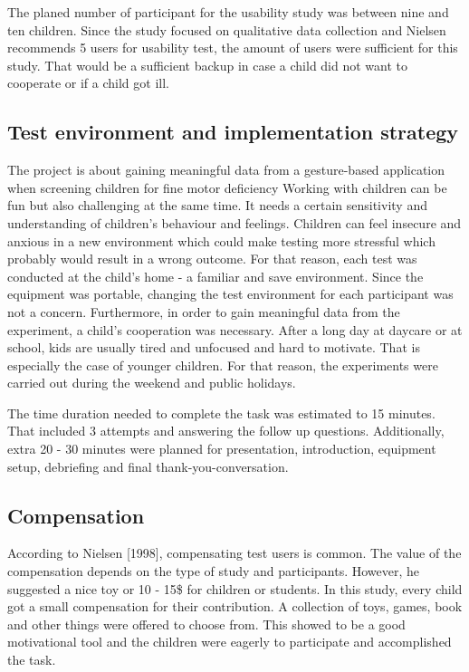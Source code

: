 The planed number of participant for the usability study was between nine and ten children. Since the study focused on qualitative data collection and Nielsen recommends 5 users for usability test, the amount of users were sufficient for this study. That would be a sufficient backup in case a child did not want to cooperate or if a child got ill. 


\subsection{Test environment and implementation strategy}
\label{sec:environmnent}

The project is about gaining meaningful data from a gesture-based application when screening children for fine motor deficiency
Working with children can be fun but also challenging at the same time. It needs a certain sensitivity and understanding of children's behaviour and feelings. Children can feel insecure  and anxious in a new environment which could make testing more stressful which probably would result in a wrong outcome. For that reason, each test was conducted at the child's home - a familiar and save environment. Since the equipment was portable, changing the test environment for each participant was not a concern.
Furthermore, in order to gain meaningful data from the experiment, a child's cooperation was necessary.  After a long day at daycare or at school, kids are usually tired and unfocused and hard to motivate. That is especially the case of younger children. For that reason, the experiments were carried out during the weekend and public holidays.  

The time duration needed to complete the task was estimated to 15 minutes. That included 3 attempts and answering the follow up questions. Additionally, extra 20 - 30 minutes were planned for presentation, introduction, equipment setup, debriefing and final thank-you-conversation.

\subsection{Compensation}

According to Nielsen [1998], compensating test users is common. The value of the compensation depends on the type of study and participants. However, he suggested a nice toy or 10 - 15\$ for children or students.
In this study, every child got a small compensation for their contribution. A collection of toys, games, book and other things were offered to choose from. This showed to be a good motivational tool and the children were eagerly to participate and accomplished the task.  


